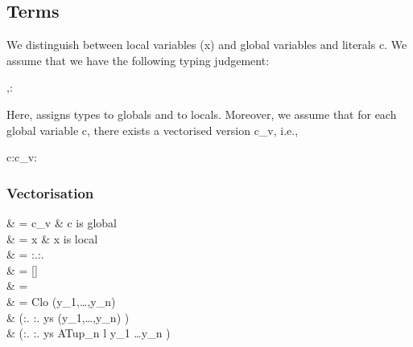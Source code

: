 \documentclass{article}
\begin{document}
\subsection*{Terms}

We distinguish between local variables (\<x\>) and global variables and
literals \<c\>.  We assume that we have the following typing judgement:

\begin{haskell}
\Delta,\Gamma{}:\sigma
\end{haskell}

Here, \<\Delta\> assigns types to globals and \<\Gamma\> to locals. Moreover,
we assume that for each global variable \<c\>, there exists a
vectorised version \<c_v\>, i.e.,

\begin{haskell}
c:\sigma\in\Delta \Longrightarrow c_v:\vect{\sigma}\in\Delta
\end{haskell}

\subsubsection*{Vectorisation}

\begin{haskell}
 & = c_v & c is global \\
 & = x   & x is local \\
 & = 
\Lambda\alpha:\kappa.:\patype{\alpha:\kappa}. \\
 & = [\vect{\sigma}] \pa{\vect{\sigma}} \\
 & = \capp{} \\
 & = Clo \vect{\sigma} \vect{\phi} \tau \pa{\tau}
                                   (y_1,\dots,y_n) \\
  &
\quad\quad(:\tau.
           :\vect{\sigma}.
            ys  (y_1,\dots,y_n) \to {}) \\
  &
\quad\quad(:\parr{\tau}.
           :\parr{\vect{\sigma}}.
            ys  ATup_n l y_1 \dots y_n \to {})
\\
\end{haskell}
\end{document}
